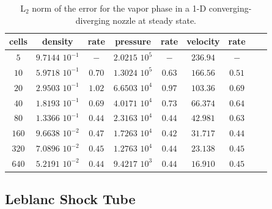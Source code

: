 \documentclass[review,10pt]{elsarticle}
\begin{document}
\begin{table}[H]
\begin{center}
 \caption{\label{tbl:l2_norm_vap} L$_2$ norm of the error for the vapor phase in a 1-D converging-diverging nozzle at steady state.}
 \begin{tabular}{|c|c|c|c|c|c|c|c|c|}
 \hline
cells & density             & rate      & pressure          & rate      & velocity & rate       \\ \hline
$5$   & $9.7144$ $10^{-1}$  & $-$       & $2.0215$ $10^{5}$ & $-$       & $236.94$ & $-$        \\ \hline
$10$  & $5.9718$ $10^{-1}$  & $0.70$ & $1.3024$ $10^{5}$ & $0.63$ & $166.56$ & $0.51$  \\ \hline
$20$  & $2.9503$ $10^{-1}$  & $1.02$  & $6.6503$ $10^{4}$ & $0.97$ & $103.36$ & $0.69$  \\ \hline
$40$  & $1.8193$ $10^{-1}$  & $0.69$ & $4.0171$ $10^{4}$ & $0.73$ & $66.374$ & $0.64$   \\ \hline
$80$  & $1.3366$ $10^{-1}$  & $0.44$ & $2.3163$ $10^{4}$ & $0.44$ & $42.981$ & $0.63$  \\ \hline
$160$ & $9.6638$ $10^{-2}$  & $0.47$ & $1.7263$ $10^{4}$ & $0.42$ & $31.717$ & $0.44$  \\ \hline
$320$ & $7.0896$ $10^{-2}$  & $0.45$ & $1.2763$ $10^{4}$ & $0.44$ & $23.138$ & $0.45$  \\ \hline
$640$ & $5.2191$ $10^{-2}$  & $0.44$ & $9.4217$ $10^{3}$ & $0.44$ & $16.910$ & $0.45$  \\ \hline
\end{tabular}
\end{center}
\nonumber
\end{table}
\subsection{Leblanc Shock Tube} \label{sec:Leblanc}
\end{document}
